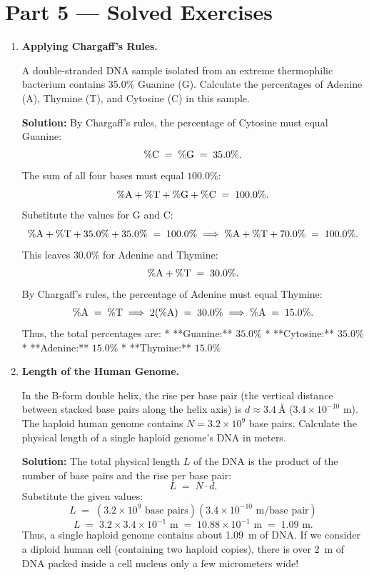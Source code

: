 \documentclass[12pt, a4paper]{book}
\begin{document}
\newpage

\section{Part 5 --- Solved Exercises}

\begin{problembox}
\begin{enumerate}[label=\textbf{E\arabic*.}]
  \item \textbf{Applying Chargaff's Rules.}
  
        A double-stranded DNA sample isolated from an extreme thermophilic bacterium contains $35.0\%$ Guanine (G). Calculate the percentages of Adenine (A), Thymine (T), and Cytosine (C) in this sample.
        
        \textbf{Solution:}
        By Chargaff's rules, the percentage of Cytosine must equal Guanine:
        \[
          \% \ce{C} \;=\; \% \ce{G} \;=\; 35.0\%.
        \]
        The sum of all four bases must equal $100.0\%$:
        \[
          \% \ce{A} + \% \ce{T} + \% \ce{G} + \% \ce{C} \;=\; 100.0\%.
        \]
        Substitute the values for G and C:
        \[
          \% \ce{A} + \% \ce{T} + 35.0\% + 35.0\% \;=\; 100.0\% \implies \% \ce{A} + \% \ce{T} + 70.0\% \;=\; 100.0\%.
        \]
        This leaves $30.0\%$ for Adenine and Thymine:
        \[
          \% \ce{A} + \% \ce{T} \;=\; 30.0\%.
        \]
        By Chargaff's rules, the percentage of Adenine must equal Thymine:
        \[
          \% \ce{A} \;=\; \% \ce{T} \implies 2 (\% \ce{A}) \;=\; 30.0\% \implies \% \ce{A} \;=\; 15.0\%.
        \]
        Thus, the total percentages are:
        * **Guanine:** $35.0\%$
        * **Cytosine:** $35.0\%$
        * **Adenine:** $15.0\%$
        * **Thymine:** $15.0\%$
        
  \item \textbf{Length of the Human Genome.}
  
        In the B-form double helix, the rise per base pair (the vertical distance between stacked base pairs along the helix axis) is $d \approx \SI{3.4}{\text{\AA}}$ ($3.4 \times 10^{-10}$ m).
        The haploid human genome contains $N = 3.2 \times 10^9$ base pairs. Calculate the physical length of a single haploid genome's DNA in meters.
        
        \textbf{Solution:}
        The total physical length $L$ of the DNA is the product of the number of base pairs and the rise per base pair:
        \[
          L \;=\; N \cdot d.
        \]
        Substitute the given values:
        \[
          L \;=\; \left( 3.2 \times 10^9 \text{ base pairs} \right) \left( 3.4 \times 10^{-10} \text{ m/base pair} \right)
        \]
        \[
          L \;=\; 3.2 \times 3.4 \times 10^{-1} \text{ m} \;=\; 10.88 \times 10^{-1} \text{ m} \;=\; 1.09 \text{ m}.
        \]
        Thus, a single haploid genome contains about \SI{1.09}{m} of DNA. If we consider a diploid human cell (containing two haploid copies), there is over \SI{2}{m} of DNA packed inside a cell nucleus only a few micrometers wide!
\end{enumerate}
\end{problembox}
\end{document}
